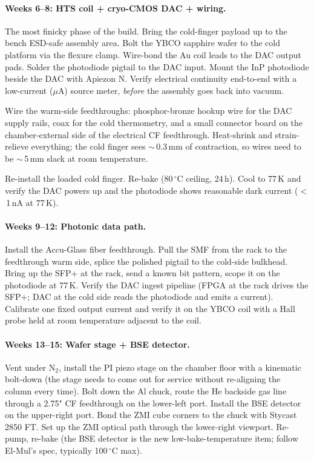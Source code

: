 \documentclass[11pt,letterpaper]{article}
\begin{document}
\paragraph{Weeks 6--8: HTS coil + cryo-CMOS DAC + wiring.} The most finicky phase of the build. Bring the cold-finger payload up to the bench ESD-safe assembly area. Bolt the YBCO sapphire wafer to the cold platform via the flexure clamp. Wire-bond the Au coil leads to the DAC output pads. Solder the photodiode pigtail to the DAC input. Mount the InP photodiode beside the DAC with Apiezon N. Verify electrical continuity end-to-end with a low-current ($\mu$A) source meter, \textit{before} the assembly goes back into vacuum.

Wire the warm-side feedthroughs: phosphor-bronze hookup wire for the DAC supply rails, coax for the cold thermometry, and a small connector board on the chamber-external side of the electrical CF feedthrough. Heat-shrink and strain-relieve everything; the cold finger sees $\sim$\,0.3\,mm of contraction, so wires need to be $\sim$\,5\,mm slack at room temperature.

Re-install the loaded cold finger. Re-bake (80\,$^\circ$C ceiling, 24\,h). Cool to 77\,K and verify the DAC powers up and the photodiode shows reasonable dark current ($<$\,1\,nA at 77\,K).

\paragraph{Weeks 9--12: Photonic data path.} Install the Accu-Glass fiber feedthrough. Pull the SMF from the rack to the feedthrough warm side, splice the polished pigtail to the cold-side bulkhead. Bring up the SFP+ at the rack, send a known bit pattern, scope it on the photodiode at 77\,K. Verify the DAC ingest pipeline (FPGA at the rack drives the SFP+; DAC at the cold side reads the photodiode and emits a current). Calibrate one fixed output current and verify it on the YBCO coil with a Hall probe held at room temperature adjacent to the coil.

\paragraph{Weeks 13--15: Wafer stage + BSE detector.} Vent under N$_2$, install the PI piezo stage on the chamber floor with a kinematic bolt-down (the stage needs to come out for service without re-aligning the column every time). Bolt down the Al chuck, route the He backside gas line through a 2.75" CF feedthrough on the lower-left port. Install the BSE detector on the upper-right port. Bond the ZMI cube corners to the chuck with Stycast 2850 FT. Set up the ZMI optical path through the lower-right viewport. Re-pump, re-bake (the BSE detector is the new low-bake-temperature item; follow El-Mul's spec, typically 100\,$^\circ$C max).
\end{document}
